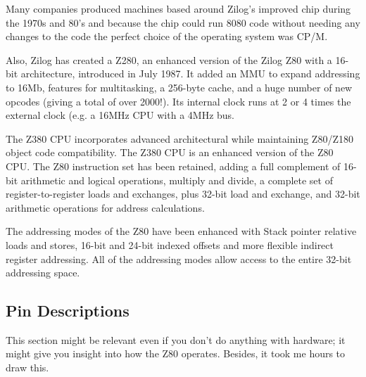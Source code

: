 Many companies produced machines based around Zilog's improved chip during the 1970s and 80's and because the chip could run 8080 code without needing any changes to the code the perfect choice of the operating system was CP/M. 

Also, Zilog has created a Z280, an enhanced version of the Zilog Z80 with a 16-bit architecture, introduced in July 1987. It added an MMU to expand addressing to 16Mb, features for multitasking, a 256-byte cache, and a huge number of new opcodes (giving a total of over 2000!). Its internal clock runs at 2 or 4 times the external clock (e.g. a 16MHz CPU with a 4MHz bus.

The Z380 CPU incorporates advanced architectural while maintaining Z80/Z180 object code compatibility. The Z380 CPU is an enhanced version of the Z80 CPU. The Z80 instruction set has been retained, adding a full complement of 16-bit arithmetic and logical operations, multiply and divide, a complete set of register-to-register loads and exchanges, plus 32-bit load and exchange, and 32-bit arithmetic operations for address calculations.

The addressing modes of the Z80 have been enhanced with Stack pointer relative loads and stores, 16-bit and 24-bit indexed offsets and more flexible indirect register addressing. All of the addressing modes allow access to the entire 32-bit addressing space.


\subsection{Pin Descriptions \cite{datasheet}}
\label{z80_pin_descriptions}

This section might be relevant even if you don't do anything with hardware; it might give you insight into how the Z80 operates. Besides, it took me hours to draw this.

